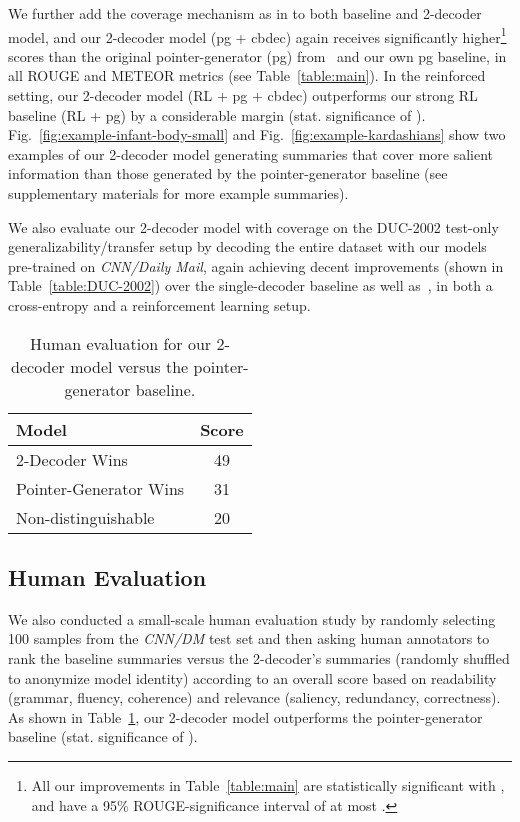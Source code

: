 \documentclass[11pt,a4paper]{article}
\def\figref#1{Fig.~\ref{#1}}
\def\tabref#1{Table~\ref{#1}}
\begin{document}
We further add the coverage mechanism as in  to both baseline and 2-decoder model, and our 2-decoder model (pg + cbdec) again receives significantly higher\footnote{All our improvements in Table~\ref{table:main} are statistically significant with , and have a 95\% ROUGE-significance interval of at most .} scores than the original pointer-generator (pg) from~ and our own pg baseline, in all ROUGE and METEOR metrics (see \tabref{table:main}).
In the reinforced setting, our 2-decoder model (RL + pg + cbdec) outperforms our strong RL baseline (RL + pg) by a considerable margin (stat. significance of ). \figref{fig:example-infant-body-small} and \figref{fig:example-kardashians} show two examples of our 2-decoder model generating summaries that cover more salient information than those generated by the pointer-generator baseline (see supplementary materials for more example summaries).

We also evaluate our 2-decoder model with coverage on the DUC-2002 test-only generalizability/transfer setup by decoding the entire dataset with our models pre-trained on \emph{CNN/Daily Mail}, again achieving decent improvements (shown in \tabref{table:DUC-2002}) over the single-decoder baseline as well as~, in both a cross-entropy and a reinforcement learning setup.


\begin{table}[t] 
\begin{small}
\centering
\begin{tabular}{|l|c|} 
\hline
Model & Score \\
\hline
2-Decoder Wins & 49 \\
Pointer-Generator Wins & 31 \\
Non-distinguishable & 20 \\
\hline
\end{tabular}
\vspace{-3pt}
\caption{Human evaluation for our 2-decoder model versus the pointer-generator baseline.
\label{table:human-eval}
\vspace{-1pt}
}
\end{small}
\end{table}

\subsection{Human Evaluation}
We also conducted a small-scale human evaluation study by randomly selecting 100 samples from the \emph{CNN/DM} test set and then asking human annotators to rank the baseline summaries versus the 2-decoder's summaries (randomly shuffled to anonymize model identity) according to an overall score based on readability (grammar, fluency, coherence) and relevance (saliency, redundancy, correctness). 
As shown in \tabref{table:human-eval}, our 2-decoder model outperforms the pointer-generator baseline (stat. significance of ).
\end{document}
